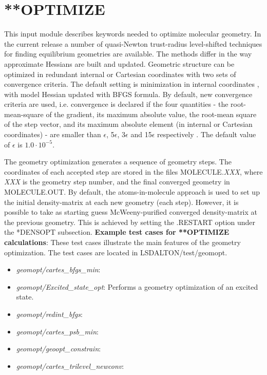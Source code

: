 \section{**OPTIMIZE}\label{sec:optimize}
This input module describes keywords needed to optimize molecular geometry.
In the current release a number of quasi-Newton trust-radius level-shifted techniques for finding 
equilibrium geometries are available. The methods differ in the way approximate Hessians are 
built and updated. Geometric structure can be optimized in redundant internal or 
Cartesian coordinates with two sets of convergence criteria. The default setting is minimization 
in internal coordinates \cite{DaltonOpt}, with model Hessian \cite{ModelHess} updated with BFGS formula. 
By default, new convergence criteria are used, i.e. convergence is declared if  the four quantities - 
the root-mean-square of the gradient, its maximum absolute value, the root-mean square of the step
vector, and its maximum absolute element (in internal or Cartesian coordinates) - 
are smaller than $\epsilon$, 5$\epsilon$, 3$\epsilon$ and 15$\epsilon$ respectively \cite{NewConv}.
The default value of $\epsilon$ is $1.0\cdot 10^{-5}$.

The geometry optimization generates a sequence of geometry steps. The coordinates of each 
accepted step are stored in the files MOLECULE.\emph{XXX}, where \emph{XXX} 
is the geometry step number, and the final converged geometry in MOLECULE.OUT.
By default, the atoms-in-molecule approach is used to set up the initial density-matrix at each new
geometry (each step). However, it is possible to take as starting guess McWeeny-purified converged
density-matrix at the previous geometry. This is achieved by setting the .RESTART option under
the *DENSOPT subsection.
\newline
\vspace{1 cm}
\noindent
\textbf{Example test cases for **OPTIMIZE calculations}: \newline
These test cases illustrate the main features of the geometry optimization. The test cases are located in LSDALTON/test/geomopt.
\begin{itemize}
\item
\textit{geomopt/cartes\_bfgs\_min}:
\item
\textit{geomopt/Excited\_state\_opt}: Performs a geometry optimization of an excited state. 
\item
\textit{geomopt/redint\_bfgs}:
\item
\textit{geomopt/cartes\_psb\_min}:
\item
\textit{geomopt/geoopt\_constrain}:
\item
\textit{geomopt/cartes\_trilevel\_newconv}: 
\end{itemize}

